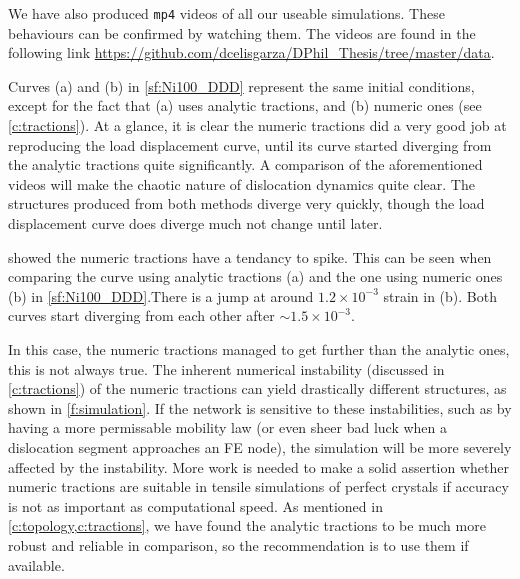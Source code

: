 

We have also produced \texttt{mp4} videos of all our useable simulations. These behaviours can be confirmed by watching them. The videos are found in the following link \href{https://github.com/dcelisgarza/DPhil_Thesis/tree/master/data}{https://github.com/dcelisgarza/DPhil\_Thesis/tree/master/data}.

Curves (a) and (b) in \cref{sf:Ni100_DDD} represent the same initial conditions, except for the fact that (a) uses analytic tractions, and (b) numeric ones (see \cref{c:tractions}). At a glance, it is clear the numeric tractions did a very good job at reproducing the load displacement curve, until its curve started diverging from the analytic tractions quite significantly. A comparison of the aforementioned videos will make the chaotic nature of dislocation dynamics quite clear. The structures produced from both methods diverge very quickly, though the load displacement curve does diverge much not change until later.

 showed the numeric tractions have a tendancy to spike. This can be seen when comparing the curve using analytic tractions (a) and the one using numeric ones (b) in \cref{sf:Ni100_DDD}.There is a jump at around $1.2\times 10^{-3}$ strain in (b). Both curves start diverging from each other after $\sim 1.5\times 10^{-3}$.

In this case, the numeric tractions managed to get further than the analytic ones, this is not always true. The inherent numerical instability (discussed in \cref{c:tractions}) of the numeric tractions can yield drastically different structures, as shown in \cref{f:simulation}. If the network is sensitive to these instabilities, such as by having a more permissable mobility law (or even sheer bad luck when a dislocation segment approaches an FE node), the simulation will be more severely affected by the instability. More work is needed to make a solid assertion whether numeric tractions are suitable in tensile simulations of perfect crystals if accuracy is not as important as computational speed. As mentioned in \cref{c:topology,c:tractions}, we have found the analytic tractions to be much more robust and reliable in comparison, so the recommendation is to use them if available.

